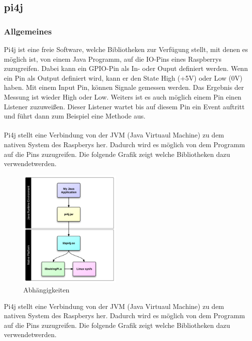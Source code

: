 \subsection{pi4j}
\subsubsection{Allgemeines}
Pi4j ist eine freie Software, welche Bibliotheken zur Verfügung stellt, mit denen es möglich ist, von einem Java Programm, auf die IO-Pins eines Raspberrys zuzugreifen. Dabei kann ein GPIO-Pin als In- oder Ouput definiert werden. Wenn ein Pin als Output definiert wird, kann er den State High (+5V) oder Low (0V) haben. Mit einem Input Pin, können Signale gemessen werden. Das Ergebnis der Messung ist wieder High oder Low. Weiters ist es auch möglich einem Pin einen Listener zuzuweißen. Dieser Listener wartet bis auf diesem Pin ein Event auftritt und führt dann zum Beispiel eine Methode aus. 
\\ \\
Pi4j stellt eine Verbindung von der JVM (Java Virtuaul Machine) zu dem nativen System des Raspberys her. Dadurch wird es möglich von dem Programm auf die Pins zuzugreifen. Die folgende Grafik zeigt welche Bibliotheken dazu verwendetwerden.

\begin{figure}
\vspace{-35pt}
  \begin{center}
    \includegraphics[width=0.45\textwidth]{Bilder/pi4j/dependencies}
  \end{center}
  \caption{Abhängigkeiten}
  \label{Magazin Vorne}
  \vspace{-170pt}
\end{figure}

Pi4j stellt eine Verbindung von der JVM (Java Virtuaul Machine) zu dem nativen System des Raspberys her. Dadurch wird es möglich von dem Programm auf die Pins zuzugreifen. Die folgende Grafik zeigt welche Bibliotheken dazu verwendetwerden.

